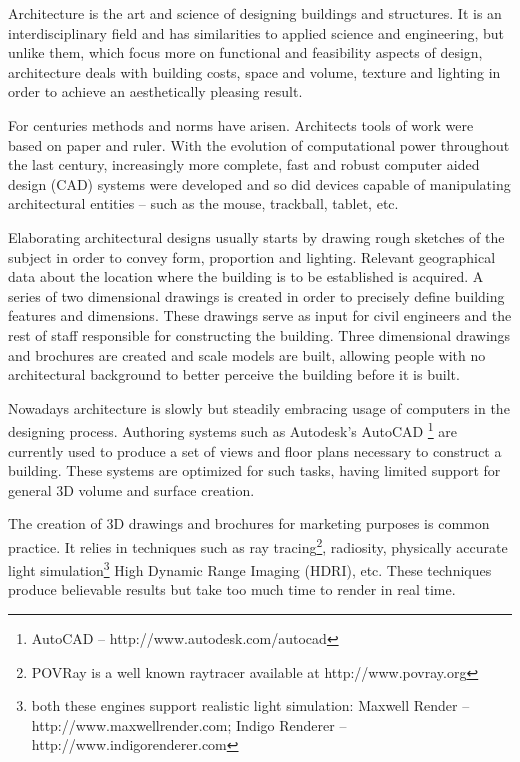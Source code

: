
Architecture is the art and science of designing buildings and structures.
It is an interdisciplinary field and has similarities to applied science and
engineering, but unlike them, which focus more on functional and feasibility aspects of design, 
architecture deals with building costs, space and volume, texture and lighting
in order to achieve an aesthetically pleasing result.

For centuries methods and norms have arisen. Architects tools of work were based on paper and ruler.
With the evolution of computational power throughout the last century, 
increasingly more complete, fast and robust computer aided design (CAD) systems were developed and so did
devices capable of manipulating architectural entities -- such as the mouse, trackball, tablet, etc.

Elaborating architectural designs usually starts by drawing rough sketches of the subject
in order to convey form, proportion and lighting. Relevant geographical data about the location
where the building is to be established is acquired. A series of two dimensional drawings is created
in order to precisely define building features and dimensions.
These drawings serve as input for civil engineers and the rest of staff responsible for constructing the building.
Three dimensional drawings and brochures are created and scale models are built, allowing
people with no architectural background to better perceive the building before it is built.

Nowadays architecture is slowly but steadily embracing usage of computers in the designing process.
Authoring systems such as Autodesk's AutoCAD
\footnote{AutoCAD -- http://www.autodesk.com/autocad}\nocite{SITE-AUTOCAD}
are currently used to produce a set of views and floor plans necessary to construct a building.
These systems are optimized for such tasks, having limited support for general 3D volume and surface creation.

The creation of 3D drawings and brochures for marketing purposes is common practice.
It relies in techniques such as
ray tracing\footnote{POVRay is a well known raytracer available at http://www.povray.org}\nocite{SITE-POVRAY},
radiosity,
physically accurate light simulation\footnote{
both these engines support realistic light simulation:
Maxwell Render -- http://www.maxwellrender.com\nocite{SITE-MAXWELL};
Indigo Renderer -- http://www.indigorenderer.com\nocite{SITE-INDIGO}}
High Dynamic Range Imaging (HDRI), etc.
These techniques produce believable results but take too much time to render in real time.

